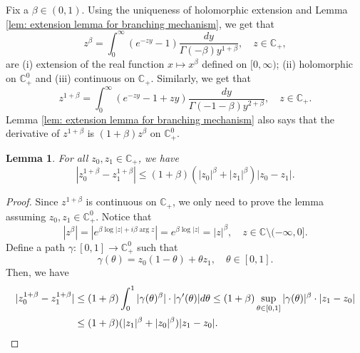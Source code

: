 \documentclass[12pt,a4paper]{amsart}
\theoremstyle{plain}
\newtheorem{lem}[thm]{Lemma}
\theoremstyle{definition}
\numberwithin{equation}{section}
\begin{document}
Fix a $\beta \in (0,1)$.
Using the uniqueness of holomorphic extension and Lemma \ref{lem: extension lemma for branching mechanism}, we get that
\begin{equation}
  z^{\beta}
	= \int_0^\infty (e^{-zy}-1) \frac{dy}{\Gamma(-\beta)y^{1+\beta}},
  \quad z\in \mathbb C_+,
\end{equation}
are (i)  extension of the real function $x\mapsto x^{\beta}$ defined on $[0,\infty)$;
(ii) holomorphic on $\mathbb C_+^0$ and (iii) continuous on $\mathbb C_+$.
Similarly, we get that
\begin{equation}
  \label{eq: stable branching on C+}
  z^{1+\beta}
  = \int_0^\infty (e^{-zy}-1+zy)\frac{dy}{\Gamma(-1-\beta)y^{2+\beta}},
  \quad z\in \mathbb C_+.
\end{equation}
Lemma \ref{lem: extension lemma for branching mechanism} also says that the derivative of $z^{1+\beta}$ is $(1+\beta)z^{\beta}$ on $\mathbb C^0_+$.
\begin{lem}
  \label{lem: Lip of power function}
  For all $z_0,z_1 \in \mathbb C_+$, we have
\begin{equation}
  \label{eq: Lip of power function}
  |z_0^{1+\beta} - z_1^{1+\beta}|
  \leq (1+\beta)(|z_0|^{\beta}+|z_1|^{\beta})|z_0 - z_1|.
\end{equation}
\end{lem}
\begin{proof}
  Since $z^{1+\beta}$ is continuous on $\mathbb C_+$, we only need to prove the lemma assuming $z_0,z_1 \in \mathbb C^0_+$.
  Notice that
\begin{equation}
  \label{eq: upper bound for beta power of z}
	|z^\beta|
	= |e^{\beta \log |z| +i\beta \operatorname {arg}z}| = e^{\beta \log |z|} = |z|^\beta,
	\quad z \in \mathbb C\setminus (-\infty, 0].
\end{equation}
Define a path $\gamma: [0,1] \to \mathbb C^0_+$ such that
\[
  \gamma(\theta)
  = z_0 (1-\theta) + \theta z_1,
  \quad \theta \in [0,1].
\]
Then, we have
\begin{align}
  |z_0^{1+\beta} - z_1^{1+\beta}|
  & \leq (1+\beta) \int_0^1 |\gamma(\theta)^{\beta}|\cdot |\gamma'(\theta)|d\theta
    \leq (1+\beta)  \sup_{\theta \in [0,1]} |\gamma(\theta)|^{\beta} \cdot |z_1-z_0| \\
  & \leq (1+\beta)  ( |z_1|^{\beta}+|z_0|^{\beta} ) |z_1-z_0|.
    \qedhere
\end{align}
\end{proof}
\end{document}
